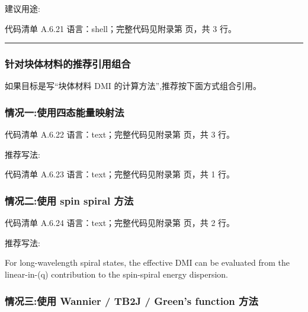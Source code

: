 \documentclass[lang=cn,scheme=chinese,color=blue,device=normal,toc=onecol,math=cm]{elegantbook}
\begin{document}
建议用途:\par


\begin{codeindexbox}{代码清单 A.6.21}
语言：shell；完整代码见附录第 \pageref{code:6:21} 页，共 3 行。
\end{codeindexbox}


\medskip\hrule\medskip


\subsubsection{针对块体材料的推荐引用组合}


如果目标是写“块体材料 DMI 的计算方法”,推荐按下面方式组合引用。\par


\subsubsection{情况一:使用四态能量映射法}


\begin{codeindexbox}{代码清单 A.6.22}
语言：text；完整代码见附录第 \pageref{code:6:22} 页，共 3 行。
\end{codeindexbox}


推荐写法:\par


\begin{codeindexbox}{代码清单 A.6.23}
语言：text；完整代码见附录第 \pageref{code:6:23} 页，共 1 行。
\end{codeindexbox}


\subsubsection{情况二:使用 spin spiral 方法}


\begin{codeindexbox}{代码清单 A.6.24}
语言：text；完整代码见附录第 \pageref{code:6:24} 页，共 2 行。
\end{codeindexbox}


推荐写法:\par


For long-wavelength spiral states, the effective DMI can be evaluated from the linear-in-(q) contribution to the spin-spiral energy dispersion.\par


\subsubsection{情况三:使用 Wannier /\allowbreak{} TB2J /\allowbreak{} Green’s function 方法}
\end{document}
